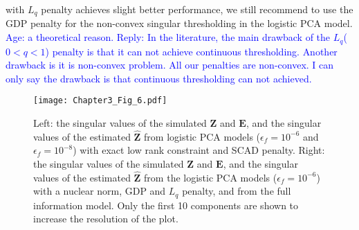 with $L_{q}$ penalty achieves slight better performance, we still recommend to use the GDP penalty for the non-convex singular thresholding in the logistic PCA model. \textcolor{blue}{Age: a theoretical reason. Reply: In the literature, the main drawback of the $L_{q}$($0<q<1$) penalty is that it can not achieve continuous thresholding. Another drawback is it is non-convex problem. All our penalties are non-convex. I can only say the drawback is that continuous thresholding can not achieved.}
\begin{figure}[htbp]
    \centering
    \texttt{[image: Chapter3\_Fig\_6.pdf]}
    \caption{Left: the singular values of the simulated $\mathbf{Z}$ and $\mathbf{E}$, and the singular values of the estimated $\hat{\mathbf{Z}}$ from logistic PCA models ($\epsilon_f = 10^{-6}$ and $\epsilon_f = 10^{-8}$) with exact low rank constraint and SCAD penalty. Right: the singular values of the simulated $\mathbf{Z}$ and $\mathbf{E}$, and the singular values of the estimated $\hat{\mathbf{Z}}$ from the logistic PCA models ($\epsilon_f = 10^{-6}$) with a nuclear norm, GDP and $L_{q}$ penalty, and from the full information model. Only the first 10 components are shown to increase the resolution of the plot.}
    \label{chapter3_fig:6}
\end{figure}

